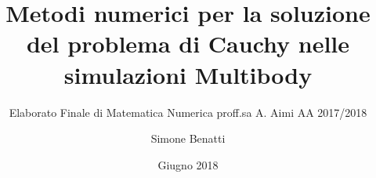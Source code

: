 \documentclass[envcountsame,envcountchap]{svmono}
\begin{document}
\author{Simone Benatti}
\title{Metodi numerici per la soluzione del problema di Cauchy nelle simulazioni Multibody
}
\subtitle{Elaborato Finale di Matematica Numerica \newline proff.sa A. Aimi \newline AA 2017/2018}
\date{Giugno 2018}
\maketitle

\frontmatter%

%
%

\tableofcontents


\mainmatter%











%

\backmatter%


\printindex

\end{document}
